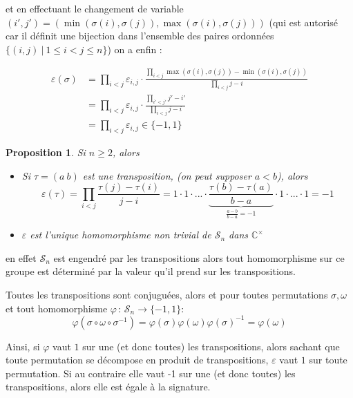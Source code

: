 \documentclass[]{article}
\newtheorem{myproposition}{Proposition}
\theoremstyle{remark}
\theoremstyle{definition}
\newcommand{\funcshort}[3]{
#1 \, : \, #2 \longrightarrow #3
}
\begin{document}
et en effectuant le changement de variable $(i', j') = (\min(\sigma(i), \sigma(j)), \max(\sigma(i), \sigma(j)))$ (qui est autorisé car il définit une bijection dans l'ensemble des paires ordonnées $\{(i, j) ~ | ~ 1 \leqslant i < j \leqslant n\}$) on a enfin :

$$
\begin{aligned}
\varepsilon(\sigma) &= \prod_{i < j} \varepsilon_{i, j} \cdot \frac{\displaystyle \prod_{i < j} \max(\sigma(i), \sigma(j)) - \min(\sigma(i), \sigma(j))}{\displaystyle \prod_{i < j} j - i} \\
&= \prod_{i < j} \varepsilon_{i, j} \cdot \frac{\displaystyle \prod_{i' < j'} j' - i'}{\displaystyle \prod_{i < j} j - i} \\
&=\prod_{i < j} \varepsilon_{i, j} \in \{-1, 1\}
\end{aligned}
$$

\begin{myproposition}
	Si $n\geqslant 2$, alors
	\begin{itemize}
		\item Si $\tau = (a ~ b)$ est une transposition, (on peut supposer $a < b$), alors $$\varepsilon(\tau) = \prod_{i < j} \frac{\tau(j) - \tau(i)}{j - i} = 1 \cdot 1 \cdot ... \cdot \underbrace{\frac{\tau(b) - \tau(a)}{b - a}}_{\frac{a - b}{b - a} = -1} \cdot 1 \cdot ... \cdot 1 = -1$$
		
		\item $\varepsilon$ est l'unique homomorphisme non trivial de $\mathscr{S}_n$ dans $\mathbb{C}^\times$
	\end{itemize}
\end{myproposition}

en effet $\mathscr{S}_n$ est engendré par les transpositions alors tout homomorphisme sur ce groupe est déterminé par la valeur qu'il prend sur les transpositions.
		
Toutes les transpositions sont conjuguées, alors et pour toutes permutations $\sigma, \omega$ et tout homomorphisme $\funcshort{\varphi}{\mathscr{S}_n}{\{-1, 1\}}$: $$\varphi(\sigma \circ \omega \circ \sigma^{-1}) = \varphi(\sigma)\varphi(\omega)\varphi(\sigma)^{-1}=\varphi(\omega)$$

Ainsi, si $\varphi$ vaut $1$ sur une (et donc toutes) les transpositions, alors sachant que toute permutation se décompose en produit de transpositions, $\varepsilon$ vaut $1$ sur toute permutation. Si au contraire elle vaut -1 sur une (et donc toutes) les transpositions, alors elle est égale à la signature.
\end{document}
